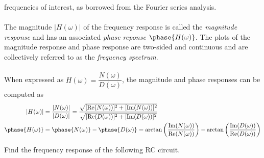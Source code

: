 \documentclass{report}
\begin{document}
frequencies of interest, as borrowed from the Fourier series analysis. 
\\ \\
The magnitude $|H(\omega)|$ of the frequency response is called the \emph{magnitude response} and has an associated \emph{phase reponse} $\phase{H(\omega)}$. 
The plots of the magnitude response and phase response are two-sided and continuous and are collectively referred to as the \emph{frequency spectrum}. 
\\ \\ 
When expressed as $H(\omega)=\dfrac{N(\omega)}{D(\omega)}$, the magnitude and phase responses can be computed as 
\begin{align}
    |H(\omega)| &= \frac{|N(\omega)|}{|D(\omega)|} = \frac{\sqrt{[\Re(N(\omega))]^2 + [\Im(N(\omega))]^2}}{\sqrt{[\Re(D(\omega))]^2 + [\Im(D(\omega))]^2}} \\
    \phase{H(\omega)} &=  \phase{N(\omega)} -  \phase{D(\omega)} = \arctan\left(\frac{\Im(N(\omega))}{\Re(N(\omega))}\right) - \arctan\left(\frac{\Im(D(\omega))}{\Re(D(\omega))}\right)
\end{align}
\begin{example}
    Find the frequency response of the following RC circuit. \\ \\
\end{example}
\end{document}
